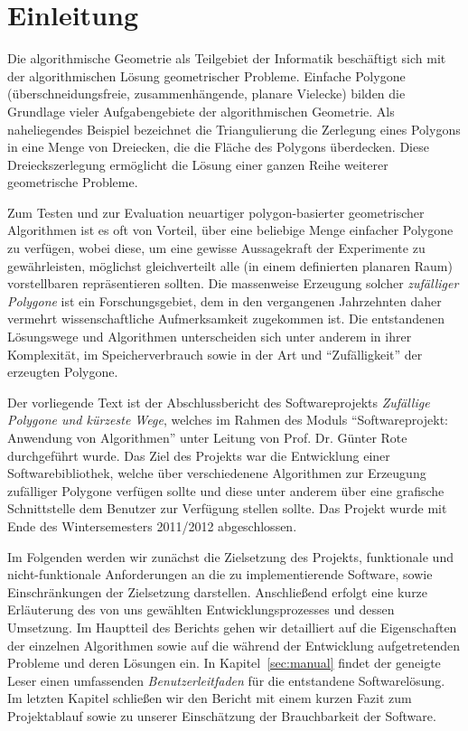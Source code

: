 \section{Einleitung}

  Die algorithmische Geometrie als Teilgebiet der Informatik beschäftigt sich
  mit der algorithmischen Lösung geometrischer Probleme. Einfache Polygone
  (überschneidungsfreie, zusammenhängende, planare Vielecke) bilden die
  Grundlage vieler Aufgabengebiete der algorithmischen Geometrie. Als
  naheliegendes Beispiel bezeichnet die Triangulierung die Zerlegung eines
  Polygons in eine Menge von Dreiecken, die die Fläche des Polygons
  überdecken. Diese Dreieckszerlegung ermöglicht die Lösung einer ganzen Reihe
  weiterer geometrische Probleme.

  Zum Testen und zur Evaluation neuartiger polygon-basierter geometrischer
  Algorithmen ist es oft von Vorteil, über eine beliebige Menge einfacher
  Polygone zu verfügen, wobei diese, um eine gewisse Aussagekraft der
  Experimente zu gewährleisten, möglichst gleichverteilt alle (in einem
  definierten planaren Raum) vorstellbaren repräsentieren sollten. Die
  massenweise Erzeugung solcher \emph{zufälliger Polygone} ist ein
  Forschungsgebiet, dem in den vergangenen Jahrzehnten daher vermehrt
  wissenschaftliche Aufmerksamkeit zugekommen ist. Die entstandenen
  Lösungswege und Algorithmen unterscheiden sich unter anderem in ihrer
  Komplexität, im Speicherverbrauch sowie in der Art und
  \enquote{Zufälligkeit} der erzeugten Polygone.

  Der vorliegende Text ist der Abschlussbericht des Softwareprojekts
  \emph{Zufällige Polygone und kürzeste Wege}, welches im Rahmen des Moduls
  \enquote{Softwareprojekt: Anwendung von Algorithmen} unter Leitung von Prof.
  Dr. Günter Rote durchgeführt wurde. Das Ziel des Projekts war die
  Entwicklung einer Softwarebibliothek, welche über verschiedenene Algorithmen
  zur Erzeugung zufälliger Polygone verfügen sollte und diese unter anderem
  über eine grafische Schnittstelle dem Benutzer zur Verfügung stellen sollte.
  Das Projekt wurde mit Ende des Wintersemesters 2011/2012 abgeschlossen.

  Im Folgenden werden wir zunächst die Zielsetzung des Projekts, funktionale
  und nicht-funktionale Anforderungen an die zu implementierende Software,
  sowie Einschränkungen der Zielsetzung darstellen. Anschließend erfolgt eine
  kurze Erläuterung des von uns gewählten Entwicklungsprozesses und dessen
  Umsetzung. Im Hauptteil des Berichts gehen wir detailliert auf die
  Eigenschaften der einzelnen Algorithmen sowie auf die während der
  Entwicklung aufgetretenden Probleme und deren Lösungen ein. In
  Kapitel~\ref{sec:manual} findet der geneigte Leser einen umfassenden
  \emph{Benutzerleitfaden} für die entstandene Softwarelösung. Im letzten
  Kapitel schließen wir den Bericht mit einem kurzen Fazit zum Projektablauf
  sowie zu unserer Einschätzung der Brauchbarkeit der Software.
